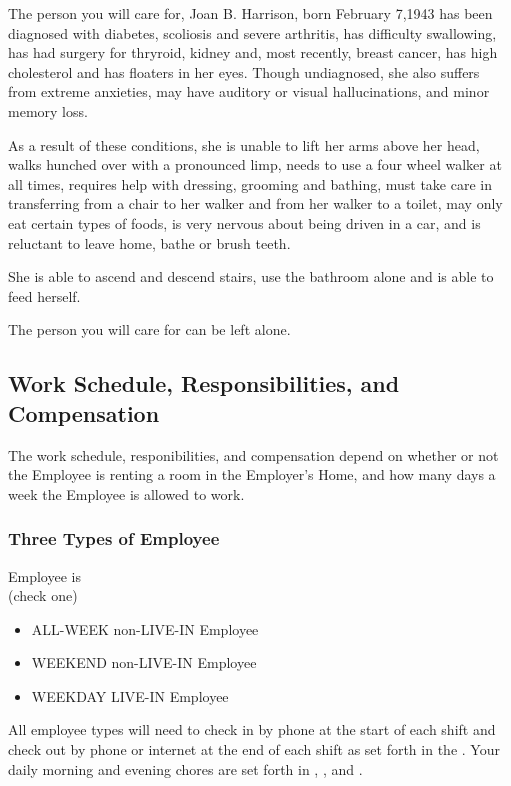 \documentclass[]{article}
\newcommand{\checkbox}{\raisebox{2pt}{\framebox[12pt][c]{\rule[7pt]{0pt}{-.3\baselineskip}}}}
\newcommand{\mom}{Joan B. Harrison}
\newcommand{\allweek}{ALL-WEEK non-LIVE-IN Employee}
\newcommand{\weekend}{WEEKEND non-LIVE-IN Employee}
\newcommand{\weekday}{WEEKDAY LIVE-IN Employee}
\begin{document}
The person you will care for, \mom{}, born February 7,1943 has been diagnosed with diabetes, scoliosis and severe arthritis, has difficulty swallowing, has had surgery for thryroid, kidney and, most recently, breast cancer, has high cholesterol and has floaters in her eyes. Though undiagnosed, she also suffers from extreme anxieties, may have auditory or visual hallucinations, and minor memory loss.

As a result of these conditions, she is unable to lift her arms above her head, walks hunched over with a pronounced limp, needs to use a four wheel walker at all times, requires help with dressing, grooming and bathing, must take care in transferring from a chair to her walker and from her walker to a toilet, may only eat certain types of foods, is very nervous about being driven in a car, and is reluctant to leave home, bathe or brush teeth.

She is able to ascend and descend stairs, use the bathroom alone and is able to feed herself.

The person you will care for can be left alone.

\subsection*{Work Schedule, Responsibilities, and Compensation}
The work schedule, responibilities, and compensation depend on whether or not the Employee is renting a room in the Employer's Home, and how many days a week the Employee is allowed to work.

\subsubsection*{Three Types of Employee}

\noindent Employee is\\
\noindent(check one)
\begin{itemize}
	\item[\checkbox] \allweek{}
	\item[\checkbox] \weekend{}
	\item[\checkbox] \weekday{}
\end{itemize}

All employee types will need to check in by phone at the start of each shift and check out by phone or internet at the end of each shift as set forth in the . Your daily morning and evening chores are set forth in \basic{}, \bathroom{}, and \shopping{}. 
\end{document}
